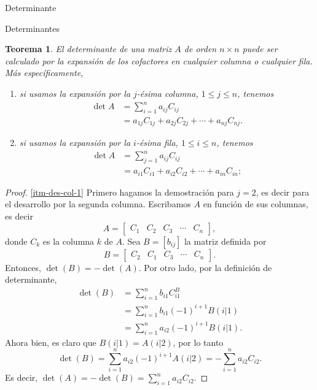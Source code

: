 \documentclass[a4paper,12pt,twoside,spanish,reqno]{amsbook}
\numberwithin{equation}{section}
\newtheorem{teorema}{Teorema}[section]
\theoremstyle{definition}
\theoremstyle{remark}
\begin{document}
\begin{chapter}{Determinante}
\begin{section}{Determinantes}
         \begin{teorema}\label{th-dessarrollo-por-columnas} El determinante de una matriz $A$ de orden $n \times n$ puede ser calculado por la expansión de los cofactores en  cualquier columna o cualquier fila. Más específicamente, 
             \begin{enumerate}
                 \item\label{itm-des-col-1} si usamos la expansión por la $j$-ésima columna, $1 \le j \le n$, tenemos
                 \begin{align*}
                 \det A &= \sum_{i=1}^{n} a_{ij} C_{ij} \\
                 & = a_{1j}C_{1j}+a_{2j}C_{2j}+\cdots+a_{nj}C_{nj}.
                 \end{align*} 
                 \item\label{itm-des-col-2} si usamos la expansión por la $i$-ésima fila, $1 \le i \le n$, tenemos
                 \begin{align*}
                 \det A &= \sum_{j=1}^{n} a_{ij} C_{ij} \\
                 & = a_{i1}C_{i1}+a_{i2}C_{i2}+\cdots+a_{in}C_{in};
                 \end{align*} 
             \end{enumerate}
         \end{teorema}
         \begin{proof} \ref{itm-des-col-1} Primero hagamos la demostración para $j=2$,  es decir para el desarrollo por la segunda columna.  Escribamos $A$ en función de sus columnas,  es decir 
             $$
             A = \begin{bmatrix}C_1& C_2&C_3 &\cdots& C_n\end{bmatrix},
             $$
             donde $C_k$  es la columna $k$ de $A$.
             Sea $B=[b_{ij}]$ la matriz definida por
             $$
             B = \begin{bmatrix} C_2 &C_1 &C_3 &\cdots &C_n\end{bmatrix}.
             $$
             Entonces, $\det(B) = -\det(A)$. Por otro lado, por la definición de determinante, 
             \begin{align*}
             \det(B) &=   \sum_{i=1}^{n} b_{i1} C^B_{i1} \\
             &= \sum_{i=1}^{n} b_{i1} (-1)^{i+1}B(i|1) \\
             & = \sum_{i=1}^{n} a_{i2} (-1)^{i+1}B(i|1).
             \end{align*} 
             Ahora bien, es claro que $B(i|1) = A(i|2)$, por lo tanto 
             $$
             \det(B)  = \sum_{i=1}^{n} a_{i2} (-1)^{i+1}A(i|2) = - \sum_{i=1}^{n} a_{i2} C_{i2}.
             $$
             Es decir, $\det(A) = -\det(B)= \sum_{i=1}^{n} a_{i2} C_{i2}$.
             

\end{proof}
\end{section}
\end{chapter}
\end{document}
